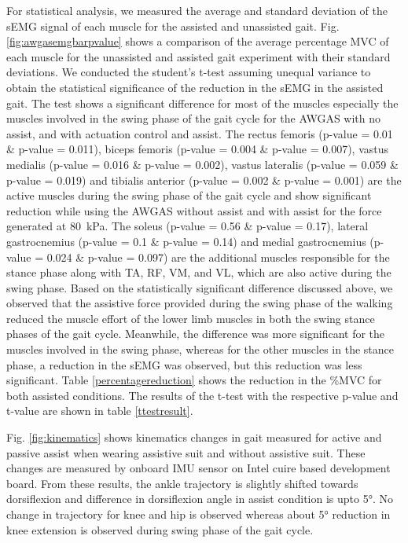 \documentclass[paper,JRM,paper]{jaciiiarticle}
\begin{document}
For statistical analysis, we measured the average and standard deviation of the sEMG signal of each muscle for the assisted and unassisted gait. Fig. \ref{fig:awgasemgbarpvalue} shows a comparison of the average percentage MVC of each muscle for the unassisted and assisted gait experiment with their standard deviations. We conducted the student’s t-test assuming unequal variance to obtain the statistical significance of the reduction in the sEMG in the assisted gait. The test shows a significant difference for most of the muscles especially the muscles involved in the swing phase of the gait cycle for the AWGAS with no assist, and with actuation control and assist. The rectus femoris (p-value = 0.01 \& p-value = 0.011), biceps femoris (p-value = 0.004 \& p-value = 0.007), vastus medialis (p-value = 0.016 \& p-value = 0.002), vastus lateralis (p-value = 0.059 \& p-value = 0.019) and tibialis anterior  (p-value = 0.002 \& p-value = 0.001) are the active muscles during the swing phase of the gait cycle and show significant reduction while using the AWGAS without assist and with assist for the force generated at \SI{80}{\kilo\pascal}. The soleus (p-value = 0.56 \& p-value = 0.17), lateral gastrocnemius (p-value = 0.1 \& p-value = 0.14) and medial gastrocnemius (p-value = 0.024 \& p-value = 0.097) are the additional muscles responsible for the stance phase along with TA, RF, VM, and VL, which are also active during the swing phase. Based on the statistically significant difference discussed above, we observed that the assistive force provided during the swing phase of the walking reduced the muscle effort of the lower limb muscles in both the swing stance phases of the gait cycle. Meanwhile, the difference was more significant for the muscles involved in the swing phase, whereas for the other muscles in the stance phase, a reduction in the sEMG was observed, but this reduction was less significant. Table \ref{percentagereduction} shows the reduction in the \%MVC for both assisted conditions. The results of the t-test with the respective p-value and t-value are shown in table \ref{ttestresult}. 

Fig. \ref{fig:kinematics} shows kinematics changes in gait measured for active and passive assist when wearing assistive suit and without assistive suit. These changes are measured by onboard IMU sensor on Intel cuire based development board. From these results, the ankle trajectory is slightly shifted towards dorsiflexion and difference in dorsiflexion angle in assist condition is upto \ang{5}. No change in trajectory for knee and hip is observed whereas about \ang{5} reduction in knee extension is observed during swing phase of the gait cycle. 
\end{document}
